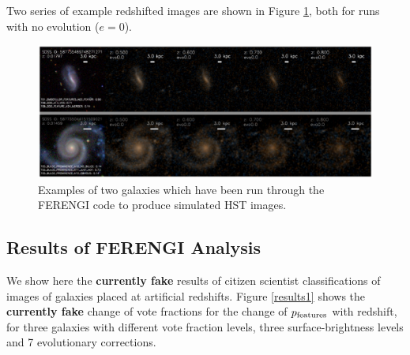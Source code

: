 \documentclass[usenatbib]{mn2e}
\begin{document}
Two series of example redshifted images are shown in Figure \ref{exampleFERENGI}, both for runs with no evolution ($e=0$). 

\begin{figure}
\includegraphics[width=160mm]{example_ferengi.ps}
\caption{Examples of two galaxies which have been run through the FERENGI code to produce simulated HST images. \label{exampleFERENGI}}
\end{figure}

 

\subsection{Results of FERENGI Analysis}

We show here the {\bf currently fake} results of citizen scientist classifications of images of galaxies placed at artificial redshifts. Figure \ref{results1} shows the {\bf currently fake} change of vote fractions for the change of $p_{\rm features}$ with redshift, for three galaxies with different vote fraction levels, three surface-brightness levels and 7 evolutionary corrections. 
\end{document}

